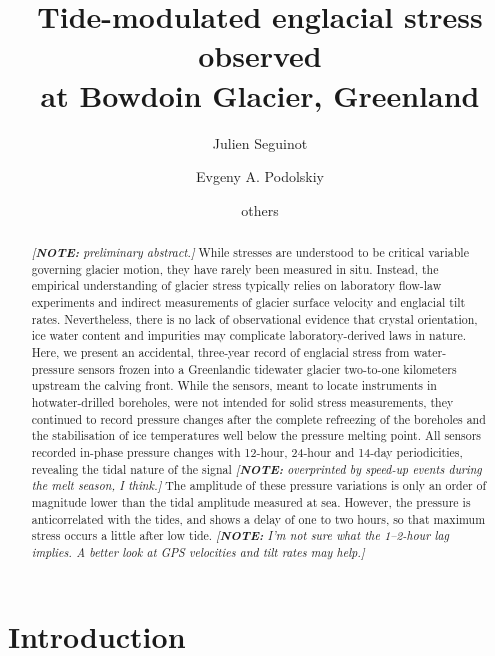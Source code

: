 \documentclass[utf8]{article}
\title{
    Tide-modulated englacial stress observed \\
    at Bowdoin Glacier, Greenland}
\author[1]{Julien Seguinot}
\author[2]{Evgeny A. Podolskiy}
\author[ ]{others}
\affil[1]{Department of Biological Sciences, University of Bergen and
          Bjerknes Centre for Climate Research, Bergen, Norway}
\affil[2]{Arctic Research Center, Hokkaido University, Sapporo, Japan}
\newcommand{\note}[1]{\textcolor{c0}{\emph{[\textbf{NOTE:} #1]}}}
\begin{document}

\maketitle

\begin{abstract}

    \note{preliminary abstract.}
    While stresses are understood to be critical variable governing
    glacier motion, they have rarely been measured in situ. Instead, the
    empirical understanding of glacier stress typically relies on laboratory
    flow-law experiments and indirect measurements of glacier surface velocity
    and englacial tilt rates. Nevertheless, there is no lack of observational
    evidence that crystal orientation, ice water content and impurities may
    complicate laboratory-derived laws in nature.
    Here, we present an accidental, three-year record of englacial stress
    from water-pressure sensors frozen into a Greenlandic tidewater glacier
    two-to-one kilometers upstream the calving front.
    While the sensors, meant to locate instruments in hotwater-drilled
    boreholes, were not intended for solid stress measurements, they
    continued to record pressure changes after the complete refreezing of the
    boreholes and the stabilisation of ice temperatures well below the pressure
    melting point.
    All sensors recorded in-phase pressure changes with 12-hour, 24-hour and
    14-day periodicities, revealing the tidal nature of the signal
    \note{overprinted by speed-up events during the melt season, I think.}
    The amplitude of these pressure variations is only an order of magnitude
    lower than the tidal amplitude measured at sea. However, the pressure is
    anticorrelated with the tides, and shows a delay of one to two hours, so
    that maximum stress occurs a little after low tide.
    \note{%
      I'm not sure what the 1--2-hour lag implies. A better look at GPS
      velocities and tilt rates may help.}
\end{abstract}


\section{Introduction}
\end{document}
